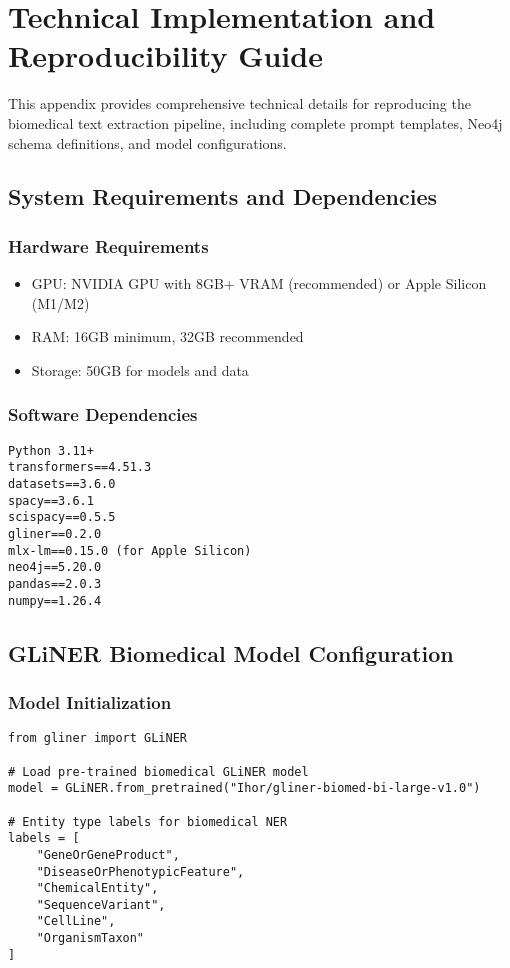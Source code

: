 
\chapter{Technical Implementation and Reproducibility Guide}

\label{AppendixB} %

This appendix provides comprehensive technical details for reproducing the biomedical text extraction pipeline, including complete prompt templates, Neo4j schema definitions, and model configurations.

\section{System Requirements and Dependencies}

\subsection{Hardware Requirements}
\begin{itemize}
    \item GPU: NVIDIA GPU with 8GB+ VRAM (recommended) or Apple Silicon (M1/M2)
    \item RAM: 16GB minimum, 32GB recommended
    \item Storage: 50GB for models and data
\end{itemize}

\subsection{Software Dependencies}
\begin{verbatim}
Python 3.11+
transformers==4.51.3
datasets==3.6.0
spacy==3.6.1
scispacy==0.5.5
gliner==0.2.0
mlx-lm==0.15.0 (for Apple Silicon)
neo4j==5.20.0
pandas==2.0.3
numpy==1.26.4
\end{verbatim}

\section{GLiNER Biomedical Model Configuration}

\subsection{Model Initialization}
\begin{verbatim}
from gliner import GLiNER

# Load pre-trained biomedical GLiNER model
model = GLiNER.from_pretrained("Ihor/gliner-biomed-bi-large-v1.0")

# Entity type labels for biomedical NER
labels = [
    "GeneOrGeneProduct",
    "DiseaseOrPhenotypicFeature", 
    "ChemicalEntity",
    "SequenceVariant",
    "CellLine",
    "OrganismTaxon"
]
\end{verbatim}

